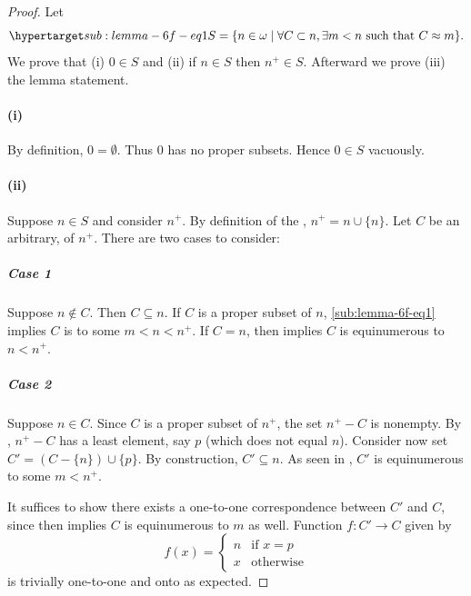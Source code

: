 \documentclass{report}
\begin{document}
  \begin{proof}

    Let
      \begin{equation}
        \hyperlabel{sub:lemma-6f-eq1}
        S = \{n \in \omega \mid \forall C \subset n,
          \exists m < n \text{ such that } C \equin m\}.
      \end{equation}
    We prove that (i) $0 \in S$ and (ii) if $n \in S$ then $n^+ \in S$.
    Afterward we prove (iii) the lemma statement.

    \paragraph{(i)}%

      By definition, $0 = \emptyset$.
      Thus $0$ has no proper subsets.
      Hence $0 \in S$ vacuously.

    \paragraph{(ii)}%

      Suppose $n \in S$ and consider $n^+$.
      By definition of the , $n^+ = n \cup \{n\}$.
      Let $C$ be an arbitrary,  of $n^+$.
      There are two cases to consider:

      \subparagraph{Case 1}%

        Suppose $n \not\in C$.
        Then $C \subseteq n$.
        If $C$ is a proper subset of $n$, \eqref{sub:lemma-6f-eq1} implies $C$
          is  to some $m < n < n^+$.
        If $C = n$, then  implies $C$ is equinumerous to
          $n < n^+$.

      \subparagraph{Case 2}%

        Suppose $n \in C$.
        Since $C$ is a proper subset of $n^+$, the set $n^+ - C$ is nonempty.
        By , $n^+ - C$ has a least
          element, say $p$ (which does not equal $n$).
        Consider now set $C' = (C - \{n\}) \cup \{p\}$.
        By construction, $C' \subseteq n$.
        As seen in , $C'$ is equinumerous to some
          $m < n^+$.

        It suffices to show there exists a one-to-one correspondence between
          $C'$ and $C$, since then  implies $C$ is
          equinumerous to $m$ as well.
        Function $f \colon C' \rightarrow C$ given by
          $$f(x) = \begin{cases}
            n & \text{if } x = p \\
            x & \text{otherwise}
          \end{cases}$$
          is trivially one-to-one and onto as expected.


\end{proof}
\end{document}
